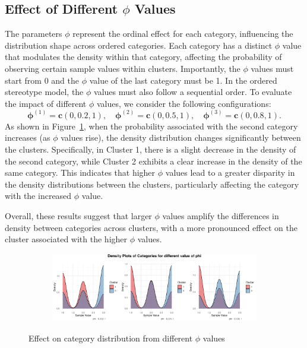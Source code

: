\documentclass{article}
\begin{document}
\clearpage

\subsection{Effect of Different $\phi$ Values}
The parameters $\phi$ represent the ordinal effect for each category, influencing the distribution shape across ordered categories. Each category has a distinct $\phi$ value that modulates the density within that category, affecting the probability of observing certain sample values within clusters.
Importantly, the $\phi$ values must start from 0 and the $\phi$ value of the last category must be 1. In the ordered stereotype model, the $\phi$ values must also follow a sequential order. 
To evaluate the impact of different $\phi$ values, we consider the following configurations:
\[
\bm{\phi}^{(1)} = \mathbf{c}(0, 0.2, 1), \quad \bm{\phi}^{(2)} = \mathbf{c}(0, 0.5, 1), \quad \bm{\phi}^{(3)} = \mathbf{c}(0, 0.8, 1).
\]
As shown in Figure~\ref{fig:phi}, 
when the probability associated with the second category increases (as $\phi$ values rise), 
the density distribution changes significantly between the clusters. 
Specifically, in Cluster 1, there is a slight decrease in the density of the second category, 
while Cluster 2 exhibits a clear increase in the density of the same category. 
This indicates that higher $\phi$ values lead to a greater disparity 
in the density distributions between the clusters, 
particularly affecting the category with the increased $\phi$ value.

Overall, these results suggest that larger $\phi$ values amplify the differences in density between categories across clusters, 
with a more pronounced effect on the cluster associated with the higher $\phi$ values.

\begin{figure}[htbp!]
  \centering
  \begin{subfigure}{1.0\textwidth}
      \centering
      \includegraphics[width=\textwidth]{images/para_sim/phi.png}
  \end{subfigure}
  \caption{Effect on category distribution from different $\phi$ values}
  \label{fig:phi}
\end{figure}
\end{document}
